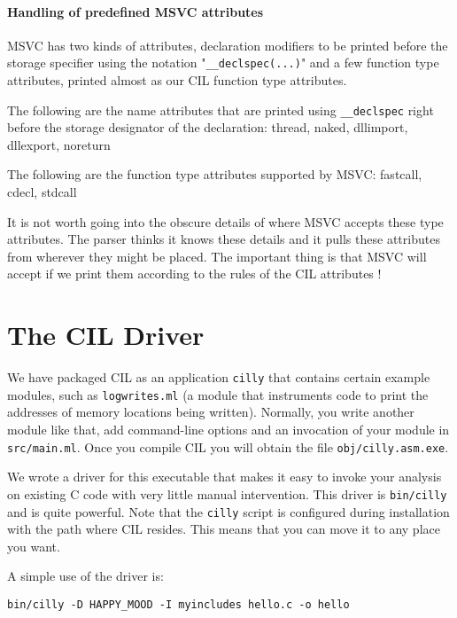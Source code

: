 \documentclass{article}
\def\t#1{{\tt #1}}
\begin{document}
\paragraph{Handling of predefined MSVC attributes}

  MSVC has two kinds of attributes, declaration modifiers to be printed before
  the storage specifier using the notation "\t{\_\_declspec(...)}" and a few
  function type attributes, printed almost as our CIL function type
  attributes. 

   The following are the name attributes that are printed using
   \t{\_\_declspec} right before the storage designator of the declaration:
   thread, naked, dllimport, dllexport, noreturn


   The following are the function type attributes supported by MSVC: 
   fastcall, cdecl, stdcall

   It is not worth going into the obscure details of where MSVC accepts these
   type attributes. The parser thinks it knows these details and it pulls
   these attributes from wherever they might be placed. The important thing
   is that MSVC will accept if we print them according to the rules of the CIL
   attributes ! 

\section{The CIL Driver}\label{sec-driver}

 We have packaged CIL as an application \t{cilly} that contains certain
example modules, such as \t{logwrites.ml} (a module
that instruments code to print the addresses of memory locations being
written). Normally, you write another module like that, add command-line
options and an invocation of your module in \t{src/main.ml}. Once you compile
CIL you will obtain the file \t{obj/cilly.asm.exe}. 

 We wrote a driver for this executable that makes it easy to invoke your
analysis on existing C code with very little manual intervention. This driver
is \t{bin/cilly} and is quite powerful. Note that the \t{cilly} script
is configured during installation with the path where CIL resides. This means
that you can move it to any place you want. 

 A simple use of the driver is:
\begin{verbatim}
bin/cilly -D HAPPY_MOOD -I myincludes hello.c -o hello
\end{verbatim}
\end{document}

